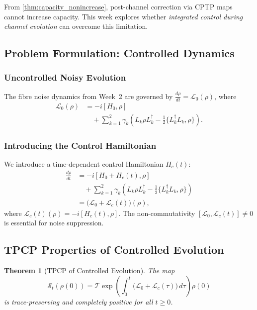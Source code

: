 \documentclass[journal,twocolumn]{IEEEtran}
\theoremstyle{definition}
\theoremstyle{plain}
\newtheorem{theorem}{Theorem}[section]
\begin{document}
From \cref{thm:capacity_nonincrease}, post-channel correction via CPTP
maps cannot increase capacity. This week explores whether
\emph{integrated control during channel evolution} can overcome this
limitation.

\subsection{Problem Formulation: Controlled Dynamics}
\label{sec:week3_problem}

\subsubsection{Uncontrolled Noisy Evolution}

The fibre noise dynamics from Week~2 are governed by
$\frac{d\rho}{dt}=\mathcal{L}_0(\rho)$, where
\begin{align}
  \mathcal{L}_0(\rho) &= -i[H_0,\rho]\nonumber\\
  &\quad+\sum_{k=1}^2\gamma_k\!\left(L_k\rho L_k^\dagger
  -\tfrac{1}{2}\{L_k^\dagger L_k,\rho\}\right).
  \label{eq:uncontrolled}
\end{align}

\subsubsection{Introducing the Control Hamiltonian}

We introduce a time-dependent control Hamiltonian $H_c(t)$:
\begin{align}
  \frac{d\rho}{dt} &= -i[H_0+H_c(t),\rho]\nonumber\\
  &\quad+\sum_{k=1}^2\gamma_k\!\left(L_k\rho L_k^\dagger
  -\tfrac{1}{2}\{L_k^\dagger L_k,\rho\}\right)\nonumber\\
  &= \bigl(\mathcal{L}_0+\mathcal{L}_c(t)\bigr)(\rho),
  \label{eq:controlled}
\end{align}
where $\mathcal{L}_c(t)(\rho)=-i[H_c(t),\rho]$. The
non-commutativity $[\mathcal{L}_0,\mathcal{L}_c(t)]\ne0$ is essential
for noise suppression.

\subsection{TPCP Properties of Controlled Evolution}

\begin{theorem}[TPCP of Controlled Evolution]
The map
\begin{equation}
  \mathcal{S}_t(\rho(0))=\mathcal{T}\!\exp\!\left(\int_0^t\!
  \bigl(\mathcal{L}_0+\mathcal{L}_c(\tau)\bigr)\,d\tau\right)\!\rho(0)
  \label{eq:controlled_evolution}
\end{equation}
is trace-preserving and completely positive for all $t\ge0$.
\end{theorem}
\end{document}
